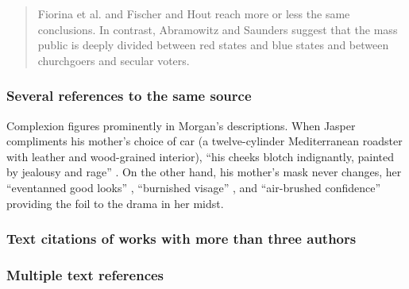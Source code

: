 \documentclass[11pt,letterpaper,oneside]{article}
\begin{document}
\begin{quote} Fiorina et al. \parencite*{fiorina2005} and Fischer and
Hout \parencite*{fischer2006} reach more or less the same conclusions.
In contrast, Abramowitz and Saunders \parencite*{abramowitz2005}
suggest that the mass public is deeply divided between red states and
blue states and between churchgoers and secular voters. \end{quote}

\setcounter{subsubsection}{26}
\subsubsection{Several references to the same source}

\begin{citenoref}%
\item Complexion figures prominently in Morgan's descriptions. When
Jasper compliments his mother's choice of car (a twelve-cylinder
Mediterranean roadster with leather and wood-grained interior), ``his
cheeks blotch indignantly, painted by jealousy and rage''
\parencite[47]{chaston2000}. On the other hand, his mother's mask
never changes, her ``even\-tanned good looks''
\parencite[56]{chaston2000}, ``burnished visage''
\parencite[101]{chaston2000}, and ``air-brushed confidence''
\parencite[211]{chaston2000} providing the foil to the drama in her
midst. \end{citenoref}

\setcounter{subsubsection}{28}
\subsubsection{Text citations of works with more than three authors}

\begin{citenoref}
\item \parencite{schonen2017a}
\item \parencite{schonen2017b}
\end{citenoref}

\subsubsection{Multiple text references}

\begin{citenoref}
\item \parencite{armstrong1989,beigl1989,pickett1985}
\item \parencites{whittaker1967,whittaker1975,wiens1989a,wiens1989b}
\item \parencites[328]{wong1999}[475]{wong2000}[67]{garcia1998}
\item \parencites{guest2006}[see also][]{stalle2008}{rahn2009}
\end{citenoref}
\end{document}

